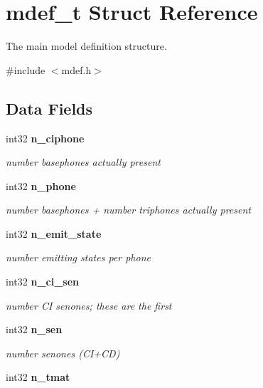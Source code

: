 \section{mdef\-\_\-t Struct Reference}
\label{structmdef__t}


The main model definition structure.  




{\ttfamily \#include $<$mdef.\-h$>$}

\subsection*{Data Fields}
\begin{DoxyCompactItemize}
\item 
int32 {\bf n\-\_\-ciphone}\label{structmdef__t_af460d8d703782cf50ed99164cee17347}

\begin{DoxyCompactList}\small\item\em number basephones actually present \end{DoxyCompactList}\item 
int32 {\bf n\-\_\-phone}\label{structmdef__t_a987f0b9bc4c951ac031f5d283960bd9f}

\begin{DoxyCompactList}\small\item\em number basephones + number triphones actually present \end{DoxyCompactList}\item 
int32 {\bf n\-\_\-emit\-\_\-state}\label{structmdef__t_a4a7ffa9d1b9a95a3bf3cca7bd955020a}

\begin{DoxyCompactList}\small\item\em number emitting states per phone \end{DoxyCompactList}\item 
int32 {\bf n\-\_\-ci\-\_\-sen}\label{structmdef__t_a68c3cc85b849363609fd5dadf412a38c}

\begin{DoxyCompactList}\small\item\em number C\-I senones; these are the first \end{DoxyCompactList}\item 
int32 {\bf n\-\_\-sen}\label{structmdef__t_a966e28ae25bd8e766dbe81549cbdcd36}

\begin{DoxyCompactList}\small\item\em number senones (C\-I+\-C\-D) \end{DoxyCompactList}\item 
int32 {\bf n\-\_\-tmat}\label{structmdef__t_a44d1d9fd99db66f1c37937e89172fed9}


\end{DoxyCompactItemize}
